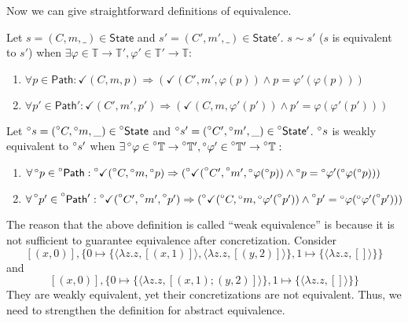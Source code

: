 \documentclass[acmsmall,screen,review]{acmart}\settopmatter{printfolios=true,printccs=false,printacmref=false}
\newcommand*{\A}[1]{\prescript{\circ}{}{#1}}
\newcommand*{\Time}{\mathbb{T}}
\newcommand*{\ATime}{\A{\Time}}
\newcommand*{\mem}{m}
\newcommand*{\State}{\mathsf{State}}
\newcommand*{\AState}{\A{\mathsf{State}}}
\newcommand*{\valid}{\checkmark}
\newcommand*{\Path}{\mathsf{Path}}
\newcommand*{\equivalent}{\sim}
\begin{document}
Now we can give straightforward definitions of equivalence.
\begin{definition}
  Let $s=(C,\mem,\_)\in\State$ and $s'=(C',\mem',\_)\in\State'$.
  $s\equivalent s'$ ($s$ is equivalent to $s'$) when $\exists\varphi\in\Time\rightarrow\Time',\varphi'\in\Time'\rightarrow\Time:$
  \begin{enumerate}
    \item $\forall p\in\Path:\valid(C,\mem,p)\Rightarrow(\valid(C',\mem',\varphi(p))\land p=\varphi'(\varphi(p)))$
    \item $\forall p'\in\Path':\valid(C',\mem',p')\Rightarrow(\valid(C,\mem,\varphi'(p'))\land p'=\varphi(\varphi'(p')))$
  \end{enumerate}
\end{definition}
\begin{definition}\label{def:weakequiv}
  Let $\A{s}=(\A{C},\A\mem,\_)\in\AState$ and $\A{s}'=(\A{C}',\A\mem',\_)\in\AState'$.
  $\A{s}$ is weakly equivalent to $\A{s}'$ when $\exists\A\varphi\in\ATime\rightarrow\ATime',\A\varphi'\in\ATime'\rightarrow\ATime:$
  \begin{enumerate}
    \item $\forall\A{p}\in\A\Path:\A\valid(\A{C},\A\mem,\A{p})\Rightarrow(\A\valid(\A{C'},\A{\mem'},\A\varphi(\A{p}))\land\A{p}=\A\varphi'(\A\varphi(\A{p})))$
    \item $\forall\A{p'}\in\A{\Path'}:\A\valid(\A{C'},\A{\mem'},\A{p'})\Rightarrow(\A\valid(\A{C},\A{\mem},\A\varphi'(\A{p'}))\land\A{p'}=\A\varphi(\A\varphi'(\A{p'})))$
  \end{enumerate}
\end{definition}
The reason that the above definition is called ``weak equivalence'' is because it is not sufficient to guarantee equivalence after concretization.
Consider
\[
  [(x,0)],\{0\mapsto\{\langle\lambda z.z,[(x,1)]\rangle,\langle\lambda z.z,[(y,2)]\rangle\},1\mapsto\{\langle\lambda z.z,[]\rangle\}\}
\]
and
\[
  [(x,0)],\{0\mapsto\{\langle\lambda z.z,[(x,1);(y,2)]\rangle\},1\mapsto\{\langle\lambda z.z,[]\rangle\}\}
\]
They are weakly equivalent, yet their concretizations are not equivalent.
Thus, we need to strengthen the definition for abstract equivalence.
\end{document}
